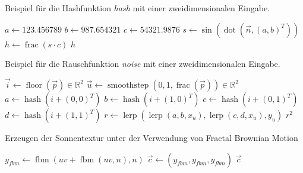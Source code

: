 \begin{algorithm}
  \caption{Beispiel für die Hashfunktion \textit{hash} mit einer zweidimensionalen Eingabe.}
  \label{alg:2d-hash}
  \SetAlgoLined

  \BlankLine
  $a\leftarrow 123.456789$\;
  $b\leftarrow 987.654321$\;
  $c\leftarrow 54321.9876$\;
  \BlankLine
  $s\leftarrow \sin(\operatorname{dot}(\vec{n}, (a, b)^T))$\;
  $h\leftarrow \operatorname{frac}(s \cdot c)$\;
  \BlankLine
  \Return $h$\;
\end{algorithm}

\begin{algorithm}
  \caption{Beispiel für die Rauschfunktion \textit{noise} mit einer zweidimensionalen Eingabe.}
  \label{alg:2d-noise}
  \SetAlgoLined

  \BlankLine
  $\vec{i}\leftarrow \operatorname{floor}(\vec{p}) \in \mathbb{R}^2$\;
  $\vec{u}\leftarrow \operatorname{smoothstep}(0, 1, \operatorname{frac}(\vec{p})) \in \mathbb{R}^2$\;
  $a\leftarrow \operatorname{hash}(i + (0, 0)^T)$\;
  $b\leftarrow \operatorname{hash}(i + (1, 0)^T)$\;
  $c\leftarrow \operatorname{hash}(i + (0, 1)^T)$\;
  $d\leftarrow \operatorname{hash}(i + (1, 1)^T)$\;
  $r\leftarrow \operatorname{lerp}(\operatorname{lerp}(a, b, x_u), \operatorname{lerp}(c, d, x_u), y_u)$\;
  \BlankLine
  \Return $r^2$\;
\end{algorithm}

\begin{algorithm}
  \caption{Erzeugen der Sonnentextur unter der Verwendung von Fractal Brownian
  Motion}
  \label{alg:suntexture}
  \SetAlgoLined

  \BlankLine
  $y_\mathit{fbm} \leftarrow \operatorname{fbm}(\mathit{uv} +
    \operatorname{fbm}(\mathit{uv}, n), n)$\;
  $\vec{c} \leftarrow (y_\mathit{fbm}, y_\mathit{fbm}, y_\mathit{fbm})$\;
  \Return $\vec{c}$\;
\end{algorithm}

